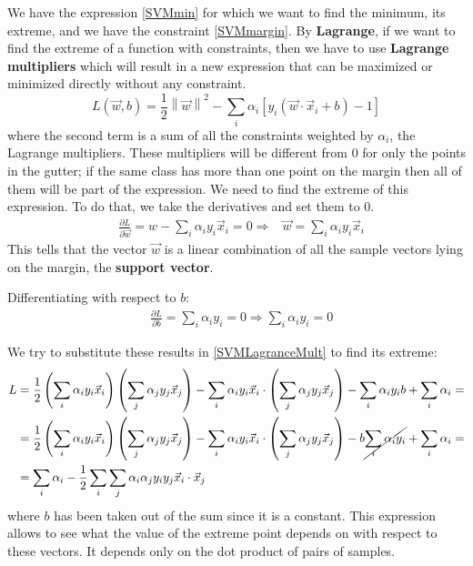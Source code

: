 \documentclass[12pt, letterpaper]{article}
\theoremstyle{definition}
\newcommand\norm[1]{\left\lVert#1\right\rVert}
\let\tb\textbf
\begin{document}
We have the expression \autoref{SVMmin} for which we want to find the minimum, its extreme, and we have the constraint \autoref{SVMmargin}. By \tb{Lagrange}, if we want to find the extreme of a function with constraints, then we have to use \tb{Lagrange multipliers} which will result in a new expression that can be maximized or minimized directly without any constraint. 
\begin{equation}
L(\vec{w}, b) = \frac{1}{2}\norm{\vec{w}}^2 - \sum_i \alpha_i\left[ y_i\left( \vec{w}\cdot \vec{x}_i+b\right)-1\right]
\label{SVMLagranceMult}
\end{equation}
where the second term is a sum of all the constraints weighted by $\alpha_i$, the Lagrange multipliers. These multipliers will be different from $0$ for only the points in the gutter; if the same class has more than one point on the margin then all of them will be part of the expression. We need to find the extreme of this expression. To do that, we take the derivatives and set them to $0$.
\begin{equation}
\begin{aligned}
&\frac{\partial L}{\partial \vec{w}} = w - \sum_i \alpha_i y_i \vec{x}_i = 0 \Rightarrow &\vec{w} = \sum_i \alpha_i y_i \vec{x}_i
\end{aligned}
\label{SVMLagrDevw}
\end{equation}
This tells that the vector $\vec{w}$ is a linear combination of all the sample vectors lying on the margin, the \tb{support vector}.

Differentiating with respect to $b$:
\begin{equation}
\begin{aligned}
&\frac{\partial L}{\partial b} = \sum_i \alpha_i y_i = 0 \Rightarrow \sum_i \alpha_i y_i = 0
\end{aligned}
\label{SVMLagrDevb}
\end{equation}

We try to substitute these results in \autoref{SVMLagranceMult} to find its extreme:
\begin{equation}
\begin{aligned}
L &= \frac{1}{2} \left(  \sum_i \alpha_i y_i \vec{x}_i\right) \left( \sum_j \alpha_j y_j \vec{x}_j\right) - \sum_i \alpha_i y_i \vec{x}_i \cdot\left(\sum_j \alpha_j y_j \vec{x}_j\right) -\sum_i \alpha_i y_i b + \sum_i \alpha_i =\\
& = \frac{1}{2} \left(  \sum_i \alpha_i y_i \vec{x}_i\right) \left( \sum_j \alpha_j y_j \vec{x}_j\right) - \sum_i \alpha_i y_i \vec{x}_i \cdot\left(\sum_j \alpha_j y_j \vec{x}_j\right) -b \cancel{\sum_i \alpha_i y_i} + \sum_i \alpha_i  =\\
&= \sum_i \alpha_i - \frac{1}{2}\sum_i \sum_j \alpha_i \alpha_j y_i y_j \vec{x}_i \cdot \vec{x}_j 
\end{aligned}
\end{equation}
where $b$ has been taken out of the sum since it is a constant. This expression allows to see what the value of the extreme point depends on with respect to these vectors. It depends only on the dot product of pairs of samples.
\end{document}
